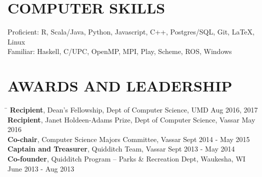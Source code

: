 \documentclass{res}
\begin{document}
\begin{resume}
{  \vspace{-1pt}
  \section{\hspace{0.2in}COMPUTER SKILLS}
    \vspace{3pt}
      Proficient: R, Scala/Java, Python, Javascript, C++, Postgres/SQL, Git, LaTeX, Linux\\
      Familiar: Haskell, C/UPC, OpenMP, MPI, Play, Scheme, ROS, Windows\\

  \vspace{-16pt}
  \section{\hspace{0.2in}AWARDS AND LEADERSHIP}
    \vspace{-3pt}
    \begin{tabbing}
      \hspace{5.65in}\=  \kill %
      {\bf Recipient}, Dean's Fellowship, Dept of Computer Science, UMD\>
          Aug 2016, 2017\\
      {\bf Recipient}, Janet Holdeen-Adams Prize, Dept of Computer Science, Vassar\>
          May 2016\\
      {\bf Co-chair}, Computer Science Majors Committee, Vassar\>
          Sept 2014 - May 2015\\
      {\bf Captain and Treasurer}, Quidditch Team, Vassar\>
          Sept 2013 - May 2014\\
      {\bf Co-founder}, Quidditch Program -- Parks \& Recreation Dept, Waukesha, WI\>
           June 2013 - Aug 2013\\
    \end{tabbing}
} %
\end{resume}
\end{document}
